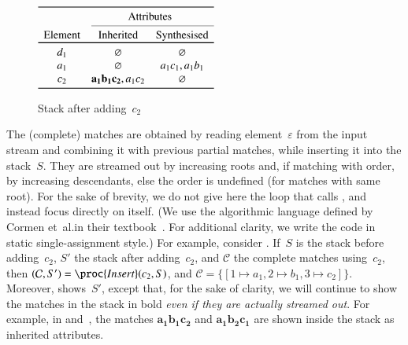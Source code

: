 \begin{wrapfigure}[9]{r}{0pt}
\centering
\(
\begin{array}{ccc}
\toprule
& \multicolumn{2}{c}{\text{Attributes}}\\
\cmidrule(l){2-3}
\text{Element} & \text{Inherited} & \text{Synthesised}\\
\toprule
d_1 & \varnothing & \varnothing\\
a_1 & \varnothing & a_1c_1, a_1b_1\\
c_2 & \mathbf{a_1b_1c_2}, a_1c_2 & \varnothing\\
\bottomrule
\end{array}
\)
\caption{Stack after adding~\(c_2\)\label{fig:stack_after_c2}}
\end{wrapfigure}
The (complete) matches are obtained by reading element~\(\varepsilon\)
from the input stream and combining it with previous partial matches,
while inserting it into the stack~\(S\). They are streamed out by
increasing roots and, if matching with order, by increasing
descendants, else the order is undefined (for matches with same
root). For the sake of brevity, we do not give here the loop that
calls , and instead focus directly on 
itself. (We use the algorithmic language defined by Cormen et~al.\@ in
their textbook~\cite{Cormen:2001}. For additional clarity, we write
the code in static single\hyp{}assignment style.) For example,
consider . If~\(S\) is the stack before
adding~\(c_2\), \(S'\) the stack after adding~\(c_2\), and
\(\mathcal{C}\) the complete matches using~\(c_2\), then \(({\cal
  C}, S') = \proc{Insert}(c_2, S)\), and \(\mathcal{C} = \{[1
  \mapsto a_1, 2 \mapsto b_1, 3 \mapsto c_2]\}\). Moreover,
 shows~\(S'\), except that, for the sake
of clarity, we will continue to show the matches in the stack in bold
\emph{even if they are actually streamed out}. For example, in
 and~, the matches
\(\mathbf{a_1b_1c_2}\) and \(\mathbf{a_1b_2c_1}\) are shown inside the
stack as inherited attributes.
